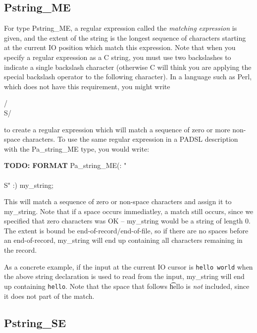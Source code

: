 \subsection{Pstring\_ME}

\aedBegin{}
\aedEnd{}

For type Pstring\_ME, a regular expression called the {\em matching
expression\/} is given, and the extent of the string is the longest
sequence of characters starting at the current IO position which match
this expression.  Note that when you specify a regular expression as
a C string, you must use two backslashes to indicate a single
backslash character (otherwise C will think you are applying the
special backslash operator to the following character). 
In a language such as Perl, which does not have this requirement,
you might write
\begin{tinycodeaux}{\leftmargin=0in}
  /\\S\*/
\end{tinycodeaux}
to create a regular expression which will match a
sequence of zero or more non-space characters.  To use the
same regular expression in a PADSL description
with the Pa\_string\_ME type, you would write:
\begin{tinycodeaux}{\leftmargin=0in}
{\bf TODO: FORMAT }
Pa\_string\_ME(: "\/\\\\S\*\/" :) my\_string;
\end{tinycodeaux}
This will match a sequence of zero or non-space characters and assign
it to my\_string.  Note that if a space occurs immediatley, a match
still occurs, since we specified that zero characters was OK --
my\_string would be a string of length 0.  The extent is bound be
end-of-record/end-of-file, so if there are no spaces before an
end-of-record, my\_string will end up containing all characters
remaining in the record.

As a concrete example, if the input at the current IO cursor is {\tt hello
world} when the above string declaration is used to read from the
input, my\_string will end up containing {\tt hello}.  Note that the
space that follows {\t hello} is {\em not} included, since it does not
part of the match.

\subsection{Pstring\_SE}

